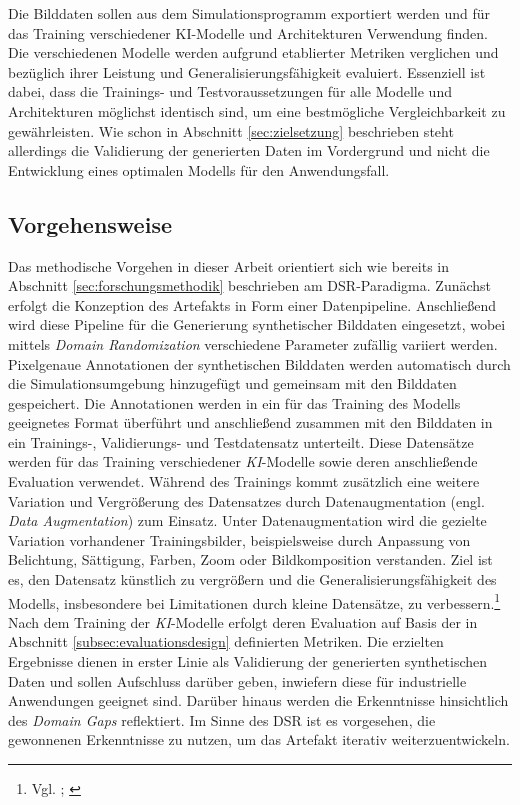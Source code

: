 Die Bilddaten sollen aus dem Simulationsprogramm exportiert werden und für das Training verschiedener \ac{KI}-Modelle und Architekturen Verwendung finden. Die verschiedenen Modelle werden aufgrund etablierter Metriken verglichen und bezüglich ihrer Leistung und Generalisierungsfähigkeit evaluiert. Essenziell ist dabei, dass die Trainings- und Testvoraussetzungen für alle Modelle und Architekturen möglichst identisch sind, um eine bestmögliche Vergleichbarkeit zu gewährleisten. Wie schon in Abschnitt \ref{sec:zielsetzung} beschrieben steht allerdings die Validierung der generierten Daten im Vordergrund und nicht die Entwicklung eines optimalen Modells für den Anwendungsfall.


\subsection{Vorgehensweise}
Das methodische Vorgehen in dieser Arbeit orientiert sich wie bereits in Abschnitt \ref{sec:forschungsmethodik} beschrieben am \ac{DSR}-Paradigma. Zunächst erfolgt die Konzeption des Artefakts in Form einer Datenpipeline. Anschließend wird diese Pipeline für die Generierung synthetischer Bilddaten eingesetzt, wobei mittels \textit{Domain Randomization} verschiedene Parameter zufällig variiert werden. Pixelgenaue Annotationen der synthetischen Bilddaten werden automatisch durch die Simulationsumgebung hinzugefügt und gemeinsam mit den Bilddaten gespeichert. Die Annotationen werden in ein für das Training des Modells geeignetes Format überführt und anschließend zusammen mit den Bilddaten in ein Trainings-, Validierungs- und Testdatensatz unterteilt. Diese Datensätze werden für das Training verschiedener \textit{KI}-Modelle sowie deren anschließende Evaluation verwendet. Während des Trainings kommt zusätzlich eine weitere Variation und Vergrößerung des Datensatzes durch Datenaugmentation (engl. \textit{Data Augmentation}) zum Einsatz. Unter Datenaugmentation wird die gezielte Variation vorhandener Trainingsbilder, beispielsweise durch Anpassung von Belichtung, Sättigung, Farben, Zoom oder Bildkomposition verstanden. Ziel ist es, den Datensatz künstlich zu vergrößern und die Generalisierungsfähigkeit des Modells, insbesondere bei Limitationen durch kleine Datensätze, zu verbessern.\footnote{Vgl. \cite[S. 2 f.]{shorten_survey_2019}; \cite{ultralytics_yolo-datenerweiterung_nodate}} Nach dem Training der \textit{KI}-Modelle erfolgt deren Evaluation auf Basis der in Abschnitt \ref{subsec:evaluationsdesign} definierten Metriken. Die erzielten Ergebnisse dienen in erster Linie als Validierung der generierten synthetischen Daten und sollen Aufschluss darüber geben, inwiefern diese für industrielle Anwendungen geeignet sind. Darüber hinaus werden die Erkenntnisse hinsichtlich des \textit{Domain Gaps} reflektiert. Im Sinne des \ac{DSR} ist es vorgesehen, die gewonnenen Erkenntnisse zu nutzen, um das Artefakt iterativ weiterzuentwickeln.

